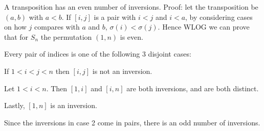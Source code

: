 \documentclass{article}
\begin{document}
A transposition has an even number of inversions. Proof: let the transposition be $(a, b)$ with $a < b$. If $[i, j]$ is a pair with $i < j$ and $i < a$, by considering cases on how $j$ compares with $a$ and $b$, $\sigma(i) < \sigma(j)$. Hence WLOG we can prove that for $S_n$ the permutation $(1, n)$ is even. 

Every pair of indices is one of the following 3 disjoint cases:

If $1 < i < j < n$ then $[i, j]$ is not an inversion.

Let $1 < i < n$. Then $[1, i]$ and $[i, n]$ are both inversions, and are both distinct.

Lastly, $[1, n]$ is an inversion.

Since the inversions in case 2 come in pairs, there is an odd number of inversions.
\end{document}

